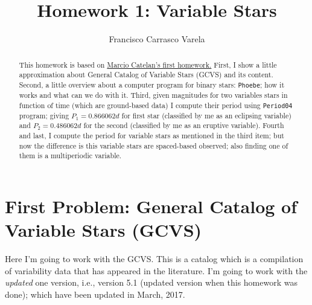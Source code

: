 







\title{Homework 1: Variable Stars}

\author{Francisco Carrasco Varela
}



\begin{abstract}
  This homework is based on 
  \href{https://uploadfiles.io/g9bzu}
  {Marcio Catelan's first homework.} First, I show a little approximation about General Catalog of Variable Stars (GCVS) and its content. Second, a little overview about a computer program for binary stars: \texttt{Phoebe}; how it works and what can we do with it. Third, given magnitudes for two variables stars in function of time (which are ground-based data) I compute their period using \texttt{Period04} program; giving $P_1 = 0.866062 d$ for first star (classified by me as an eclipsing variable) and $P_2 = 0.486062 d$ for the second (classified by me as an eruptive variable). Fourth and last, I compute the period for variable stars as mentioned in the third item; but now the difference is this variable stars are spaced-based observed; also finding one of them is a multiperiodic variable. 

\end{abstract}



\section{First Problem: General Catalog of Variable Stars (GCVS)}
\label{p1}

Here I'm going to work with the GCVS. This is a catalog which is a compilation of variability data that has appeared in the literature. I'm going to work with the \emph{updated} one version, i.e., version 5.1 (updated version when this homework was done); which have been updated in March, 2017. 

